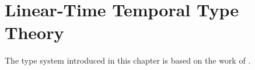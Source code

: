 \chapter{Linear-Time Temporal Type Theory}\label{chapter:the-type-system}

The type system introduced in this chapter is based on the work of \cite{Paykin2016TheEO}.



